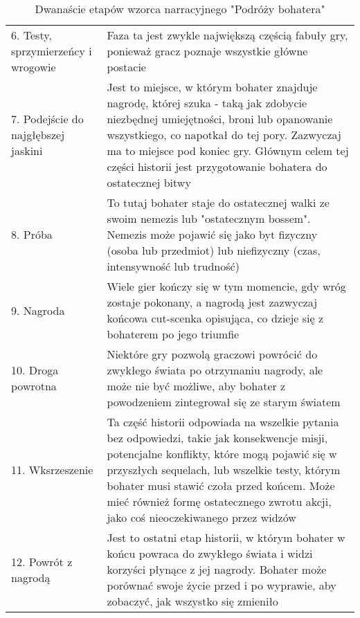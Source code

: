 \begin{table}[h!]
\begin{center}
\begin{tabular}{p{1.5in} p{4in}}
			6. Testy, sprzymierzeńcy i wrogowie & Faza ta jest zwykle największą częścią fabuły gry, ponieważ gracz poznaje wszystkie główne postacie                                                                                                                                                                                                                             \\
			7. Podejście do najgłębszej jaskini & Jest to miejsce, w którym bohater znajduje nagrodę, której szuka - taką jak zdobycie niezbędnej umiejętności, broni lub opanowanie wszystkiego, co napotkał do tej pory. Zazwyczaj ma to miejsce pod koniec gry. Głównym celem tej części historii jest przygotowanie bohatera do ostatecznej bitwy                             \\
			8. Próba                            & To tutaj bohater staje do ostatecznej walki ze swoim nemezis lub "ostatecznym bossem". Nemezis może pojawić się jako byt fizyczny (osoba lub przedmiot) lub niefizyczny (czas, intensywność lub trudność)                                                                                                                       \\
			9. Nagroda                          & Wiele gier kończy się w tym momencie, gdy wróg zostaje pokonany, a nagrodą jest zazwyczaj końcowa cut-scenka opisująca, co dzieje się z bohaterem po jego triumfie                                                                                                                                                              \\
			10. Droga powrotna                  & Niektóre gry pozwolą graczowi powrócić do zwykłego świata po otrzymaniu nagrody, ale może nie być możliwe, aby bohater z powodzeniem zintegrował się ze starym światem                                                                                                                                                          \\
			11. Wksrzeszenie                    & Ta część historii odpowiada na wszelkie pytania bez odpowiedzi, takie jak konsekwencje misji, potencjalne konflikty, które mogą pojawić się w przyszłych sequelach, lub wszelkie testy, którym bohater musi stawić czoła przed końcem. Może mieć również formę ostatecznego zwrotu akcji, jako coś nieoczekiwanego przez widzów \\
			12. Powrót z nagrodą                & Jest to ostatni etap historii, w którym bohater w końcu powraca do zwykłego świata i widzi korzyści płynące z jej nagrody. Bohater może porównać swoje życie przed i po wyprawie, aby zobaczyć, jak wszystko się zmieniło                                                                                                       \\
			\hline
		\end{tabular}
	\end{center}
	\caption{Dwanaście etapów wzorca narracyjnego "Podróży bohatera" \cite{narrative_structures}}\label{tab1:ch1_1}
\end{table}

